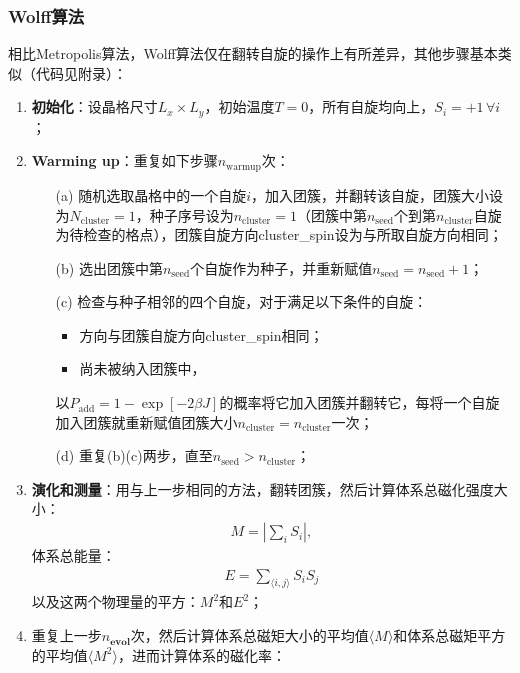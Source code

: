 \documentclass[UTF8,10pt,a4paper]{article}
\theoremstyle{Problem}
\theoremstyle{Solution}
\providecommand{\abs}[1]{\left\lvert#1\right\rvert}
\begin{document}
\subsubsection{Wolff算法}

相比Metropolis算法，Wolff算法仅在翻转自旋的操作上有所差异，其他步骤基本类似（代码见附录）：
\begin{enumerate}
    \item \textbf{初始化}：设晶格尺寸$L_x\times L_y$，初始温度$T=0$，所有自旋均向上，$S_i=+1\,\forall i$；
    \item \textbf{Warming up}：重复如下步骤$n_{\text{warmup}}$次：
    \begin{enumerate}
        \item[(a)] 随机选取晶格中的一个自旋$i$，加入团簇，并翻转该自旋，团簇大小设为$N_{\text{cluster}}=1$，种子序号设为$n_{\text{cluster}}=1$（团簇中第$n_{\text{seed}}$个到第$n_{\text{cluster}}$自旋为待检查的格点），团簇自旋方向cluster\_spin设为与所取自旋方向相同；
        \item[(b)] 选出团簇中第$n_{\text{seed}}$个自旋作为种子，并重新赋值$n_{\text{seed}}=n_{\text{seed}}+1$；
        \item[(c)] 检查与种子相邻的四个自旋，对于满足以下条件的自旋：
        \begin{itemize}
            \item 方向与团簇自旋方向cluster\_spin相同；
            \item 尚未被纳入团簇中，
        \end{itemize}
        以$P_{\text{add}}=1-\exp[-2\beta J]$的概率将它加入团簇并翻转它，每将一个自旋加入团簇就重新赋值团簇大小$n_{\text{cluster}}=n_{\text{cluster}}$一次；
        \item[(d)] 重复(b)(c)两步，直至$n_{\text{seed}}>n_{\text{cluster}}$；
    \end{enumerate}
    \item \textbf{演化和测量}：用与上一步相同的方法，翻转团簇，然后计算体系总磁化强度大小：
    \begin{align}
        M=\abs{\sum_iS_i},
    \end{align}
    体系总能量：
    \begin{align}
        E=\sum_{\langle i,j\rangle}S_iS_j
    \end{align}
    以及这两个物理量的平方：$M^2$和$E^2$；
    \item 重复上一步$n_{\textbf{evol}}$次，然后计算体系总磁矩大小的平均值$\langle M\rangle$和体系总磁矩平方的平均值$\langle M^2\rangle$，进而计算体系的磁化率：
    \begin{align}

\end{align}
\end{enumerate}
\end{document}
